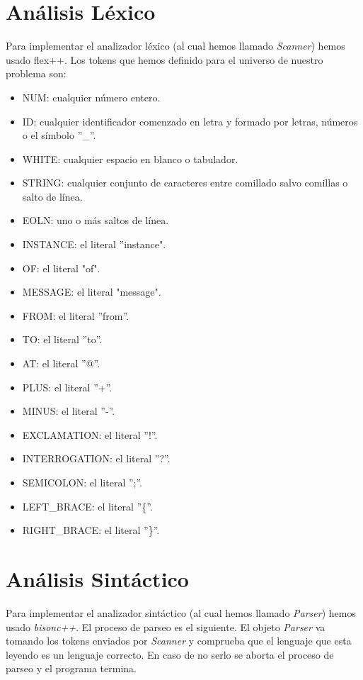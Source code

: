 \documentclass[12pt,a4paper]{report}
\begin{document}
\section{Análisis Léxico}
Para implementar el analizador léxico (al cual hemos llamado \textit{Scanner}) hemos usado flex++. Los tokens que hemos definido para el universo de nuestro problema son:

\begin{itemize}
\item NUM: cualquier número entero.
\item ID: cualquier identificador comenzado en letra y formado por letras, números o el símbolo ''\_''.
\item WHITE: cualquier espacio en blanco o tabulador.
\item STRING: cualquier conjunto de caracteres entre comillado salvo comillas o salto de línea.
\item EOLN: uno o más saltos de línea.
\item INSTANCE: el literal ''instance".
\item OF: el literal "of".
\item MESSAGE: el literal "message".
\item FROM: el literal ''from''.
\item TO: el literal ''to''.
\item AT: el literal ''@''.
\item PLUS: el literal ''+''.
\item MINUS: el literal ''-''.
\item EXCLAMATION: el literal ''!''.
\item INTERROGATION: el literal ''?''.
\item SEMICOLON: el literal '';''.
\item LEFT\_BRACE: el literal ''\{''.
\item RIGHT\_BRACE: el literal ''\}''.
\end{itemize}

\section{Análisis Sintáctico}

Para implementar el analizador sintáctico (al cual hemos llamado \textit{Parser}) hemos usado \textit{bisonc++}. El proceso de parseo es el siguiente. El objeto \textit{Parser} va tomando los tokens enviados por \textit{Scanner} y comprueba que el lenguaje que esta leyendo es un lenguaje correcto. En caso de no serlo se aborta el proceso de parseo y el programa termina.
\end{document}

